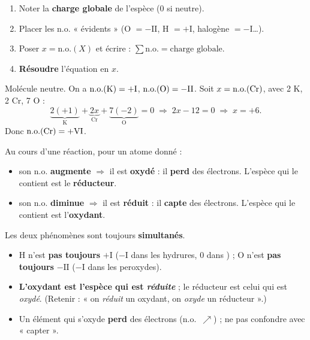 \documentclass[11pt,a4paper]{article}
\begin{document}
\begin{methode}
\begin{enumerate}[label=\textbf{\arabic*.},leftmargin=2.0em,topsep=1pt,itemsep=1pt]
  \item Noter la \textbf{charge globale} de l'espèce ($0$ si neutre).
  \item Placer les n.o. « évidents » (O $=-\mathrm{II}$, H $=+\mathrm{I}$, halogène $=-\mathrm{I}$\ldots).
  \item Poser $x=\mathrm{n.o.}(X)$ et écrire : $\sum \mathrm{n.o.}=\text{charge globale}$.
  \item \textbf{Résoudre} l'équation en $x$.
\end{enumerate}
\end{methode}

\begin{exemplebox}
Molécule neutre. On a $\mathrm{n.o.}(\ce{K})=+\mathrm{I}$, $\mathrm{n.o.}(\ce{O})=-\mathrm{II}$.
Soit $x=\mathrm{n.o.}(\ce{Cr})$, avec 2 K, 2 Cr, 7 O :
\[
\underbrace{2(+1)}_{\text{K}}+\underbrace{2x}_{\text{Cr}}+\underbrace{7(-2)}_{\text{O}}=0
\;\Longrightarrow\;2x-12=0\;\Longrightarrow\;x=+6.
\]
Donc $\mathrm{n.o.}(\ce{Cr})=+\mathrm{VI}$.
\end{exemplebox}

\begin{cle}
Au cours d'une réaction, pour un atome donné :
\begin{itemize}[leftmargin=1.5em,topsep=1pt,itemsep=1pt]
  \item son n.o. \textbf{augmente} $\Rightarrow$ il est \textbf{oxydé} : il \textbf{perd} des
        électrons. L'espèce qui le contient est le \textbf{réducteur}.
  \item son n.o. \textbf{diminue} $\Rightarrow$ il est \textbf{réduit} : il \textbf{capte} des
        électrons. L'espèce qui le contient est l'\textbf{oxydant}.
\end{itemize}
Les deux phénomènes sont toujours \textbf{simultanés}.
\end{cle}

\begin{piege}
\begin{itemize}[leftmargin=1.5em,topsep=1pt,itemsep=1pt]
  \item H n'est \textbf{pas toujours} $+\mathrm{I}$ ($-\mathrm{I}$ dans les hydrures, $0$ dans ) ;
        O n'est \textbf{pas toujours} $-\mathrm{II}$ ($-\mathrm{I}$ dans les peroxydes).
  \item \textbf{L'oxydant est l'espèce qui est \emph{réduite}} ; le réducteur est celui qui est
        \emph{oxydé}. (Retenir : « on \emph{réduit} un oxydant, on \emph{oxyde} un réducteur ».)
  \item Un élément qui s'oxyde \textbf{perd} des électrons (n.o.\ $\nearrow$) ; ne pas confondre avec
        « capter ».
\end{itemize}
\end{piege}
\end{document}
